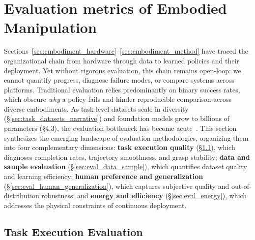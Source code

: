 \documentclass[acmsmall,screen,review,anonymous]{acmart}
\begin{document}
\section{Evaluation metrics of Embodied Manipulation}\label{sec:evaluation}

Sections~\ref{sec:embodiment_hardware}--\ref{sec:embodiment_method} have traced the organizational chain from hardware through data to learned policies and their deployment. Yet without rigorous evaluation, this chain remains open-loop: we cannot quantify progress, diagnose failure modes, or compare systems across platforms. Traditional evaluation relies predominantly on binary success rates, which obscure \emph{why} a policy fails and hinder reproducible comparison across diverse embodiments. As task-level datasets scale in diversity (\S\ref{sec:task_datasets_narrative}) and foundation models grow to billions of parameters (\S4.3), the evaluation bottleneck has become acute~\cite{zhou2025autoeval, atreya2025roboarena}. This section synthesizes the emerging landscape of evaluation methodologies, organizing them into four complementary dimensions: \textbf{task execution quality} (\S\ref{sec:eval_task_execution}), which diagnoses completion rates, trajectory smoothness, and grasp stability; \textbf{data and sample evaluation} (\S\ref{sec:eval_data_sample}), which quantifies dataset quality and learning efficiency; \textbf{human preference and generalization} (\S\ref{sec:eval_human_generalization}), which captures subjective quality and out-of-distribution robustness; and \textbf{energy and efficiency} (\S\ref{sec:eval_energy}), which addresses the physical constraints of continuous deployment.

\subsection{Task Execution Evaluation}\label{sec:eval_task_execution}
\end{document}
